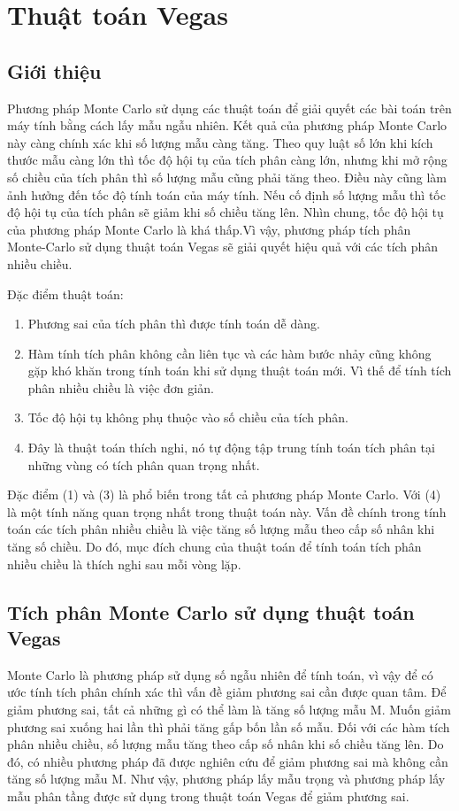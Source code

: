 \chapter{Thuật toán Vegas}\label{ch:3}
\section{Giới thiệu}\label{sec:3.1}
Phương pháp Monte Carlo sử dụng các thuật toán để giải quyết các bài toán trên máy tính bằng cách lấy mẫu ngẫu nhiên. Kết quả của phương pháp Monte Carlo này càng chính xác khi số lượng mẫu càng tăng. Theo quy luật số lớn khi kích thước mẫu càng lớn thì tốc độ hội tụ của tích phân càng lớn, nhưng khi mở rộng số chiều của tích phân thì số lượng mẫu cũng phải tăng theo. Điều này cũng làm ảnh hưởng đến tốc độ tính toán của máy tính. Nếu cố định số lượng mẫu thì tốc độ hội tụ của tích phân sẽ giảm khi số chiều tăng lên. Nhìn chung, tốc độ hội tụ của phương pháp Monte Carlo là khá thấp.Vì vậy, phương pháp tích phân Monte-Carlo sử dụng thuật toán Vegas sẽ giải quyết hiệu quả với các tích phân nhiều chiều.
\par
Đặc điểm thuật toán:\cite{vegas} 
\begin{enumerate}
      \item Phương sai của tích phân thì được tính toán dễ dàng.
      \item Hàm tính tích phân không cần liên tục và các hàm bước nhảy cũng không gặp khó khăn trong tính toán khi sử dụng thuật toán mới. Vì thế để tính tích phân nhiều chiều là việc đơn giản.
      \item Tốc độ hội tụ không phụ thuộc vào số chiều của tích phân.
      \item Đây là thuật toán thích nghi, nó tự động tập trung tính toán tích phân tại những vùng có tích phân quan trọng nhất.
\end{enumerate}
Đặc điểm (1) và (3) là phổ biến trong tất cả phương pháp Monte Carlo. Với (4) là một tính năng quan trọng nhất trong thuật toán này. Vấn đề chính trong tính toán các tích phân nhiều chiều là việc tăng số lượng mẫu theo cấp số nhân khi tăng số chiều. 
Do đó, mục đích chung của thuật toán để tính toán tích phân nhiều chiều là thích nghi sau mỗi vòng lặp.
\section{Tích phân Monte Carlo sử dụng thuật toán Vegas}\label{sec:3.2}
Monte Carlo là phương pháp sử dụng số ngẫu nhiên để tính toán, vì vậy để có ước tính tích phân chính xác thì 
vấn đề giảm phương sai cần được quan tâm. 
Để giảm phương sai, tất cả những gì có thể làm là tăng số lượng mẫu M. 
Muốn giảm phương sai xuống hai lần thì phải tăng gấp bốn lần số mẫu. 
Đối với các hàm tích phân nhiều chiều, 
số lượng mẫu tăng theo cấp số nhân khi số chiều tăng lên. 
Do đó, có nhiều phương pháp đã được nghiên cứu để giảm phương sai mà không cần tăng số lượng mẫu M. 
Như vậy, phương pháp lấy mẫu trọng và phương pháp lấy mẫu phân tầng được sử dụng trong thuật toán Vegas để giảm phương sai.
\par
